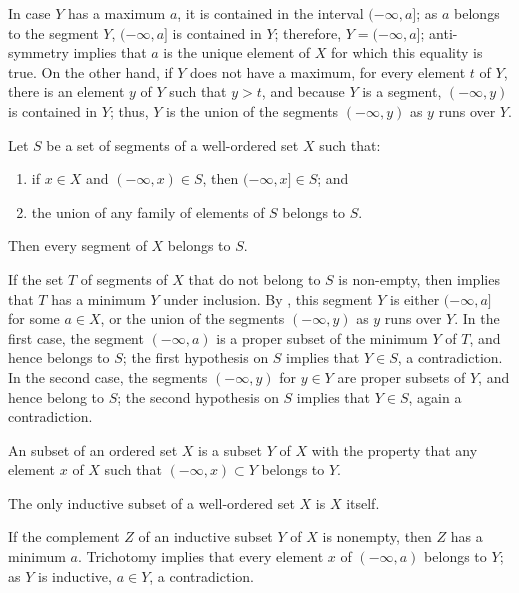 \documentclass{article}
\begin{document}
In case \(Y\) has a maximum \(a\), it is contained in the interval
\((-\infty, a]\); as \(a\) belongs to the segment \(Y\),
\((-\infty, a]\) is contained in \(Y\); therefore,
\(Y = (-\infty, a]\); anti-symmetry implies that \(a\) is the unique
element of \(X\) for which this equality is true.  On the other hand,
if \(Y\) does not have a maximum, for every element \(t\) of \(Y\),
there is an element \(y\) of \(Y\) such that \(y > t\), and because
\(Y\) is a segment, \((-\infty, y)\) is contained in \(Y\); thus,
\(Y\) is the union of the segments \((-\infty, y)\) as \(y\) runs over
\(Y\).

\begin{theorem}
  \label{thm:y3go6w2h}
  Let \(S\) be a set of segments of a well-ordered set \(X\) such
  that:
  \begin{enumerate}
  \item if \(x \in X\) and \((-\infty, x) \in S\), then
    \((-\infty, x] \in S\); and
  \item the union of any family of elements of \(S\) belongs to \(S\).
  \end{enumerate}
  Then every segment of \(X\) belongs to \(S\).
\end{theorem}

If the set \(T\) of segments of \(X\) that do not belong to \(S\) is
non-empty, then  implies that \(T\) has a minimum
\(Y\) under inclusion.  By , this segment \(Y\) is
either \((-\infty, a]\) for some \(a \in X\), or the union of the
segments \((-\infty, y)\) as \(y\) runs over \(Y\).  In the first
case, the segment \((-\infty, a)\) is a proper subset of the minimum
\(Y\) of \(T\), and hence belongs to \(S\); the first hypothesis on
\(S\) implies that \(Y \in S\), a contradiction.  In the second case,
the segments \((-\infty, y)\) for \(y \in Y\) are proper subsets of
\(Y\), and hence belong to \(S\); the second hypothesis on \(S\)
implies that \(Y \in S\), again a contradiction.

An  subset of an ordered set \(X\) is a subset
\(Y\) of \(X\) with the property that any element \(x\) of \(X\) such
that \((-\infty, x) \subset Y\) belongs to \(Y\).

\begin{theorem}
  \label{thm:5vxgawq0}
  The only inductive subset of a well-ordered set \(X\) is \(X\)
  itself.
\end{theorem}

If the complement \(Z\) of an inductive subset \(Y\) of \(X\) is
nonempty, then \(Z\) has a minimum \(a\).  Trichotomy implies that
every element \(x\) of \((-\infty, a)\) belongs to \(Y\); as \(Y\) is
inductive, \(a \in Y\), a contradiction.
\end{document}
